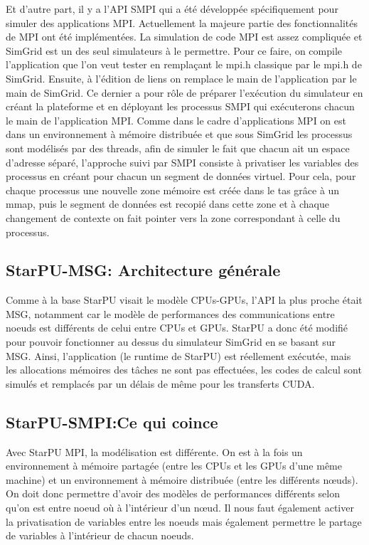 \documentclass[smallextended]{svjour3}
\begin{document}
Et d'autre part, il y a l'API SMPI qui a été développée
spécifiquement pour simuler des applications MPI. Actuellement la
majeure partie des fonctionnalités de MPI ont été implémentées. La
simulation de code MPI est assez compliquée et SimGrid est un des
seul simulateurs à le permettre. Pour ce faire, on compile
l'application que l'on veut tester en remplaçant le mpi.h classique
par le mpi.h de SimGrid. Ensuite, à l'édition de liens on remplace
le main de l'application par le main de SimGrid. Ce dernier a pour
rôle de préparer l'exécution du simulateur en créant la plateforme
et en déployant les processus SMPI qui exécuterons chacun le main
de l'application MPI. Comme dans le cadre d'applications MPI on est
dans un environnement à mémoire distribuée et que sous SimGrid les
processus sont modélisés par des threads, afin de simuler le fait
que chacun ait un espace d'adresse séparé, l'approche suivi par SMPI
consiste à privatiser les variables des processus en créant pour
chacun un segment de données virtuel. Pour cela, pour chaque processus
une nouvelle zone mémoire est créée dans le tas grâce à un mmap, puis le
segment de données est recopié dans cette zone et à chaque
changement de contexte on fait pointer vers la zone correspondant à
celle du processus. 

\subsection{StarPU-MSG: Architecture générale}
\label{sec-3-2}
Comme à la base StarPU visait le modèle CPUs-GPUs, l'API la plus
proche était MSG, notamment car le modèle de performances des
communications entre noeuds est différents de celui entre CPUs et
GPUs. StarPU a donc été modifié pour pouvoir fonctionner au dessus
du simulateur SimGrid en se basant sur MSG. Ainsi, l'application
(le runtime de StarPU) est réellement exécutée, mais les
allocations mémoires des tâches ne sont pas effectuées, les codes
de calcul sont simulés et remplacés par un délais de même pour les
transferts CUDA.  

\subsection{StarPU-SMPI:Ce qui coince}
\label{sec-3-3}

Avec StarPU MPI, la modélisation est différente. On est à la fois
un environnement à mémoire partagée (entre les CPUs et les GPUs
d'une même machine) et un environnement à mémoire distribuée
(entre les différents nœuds). On doit donc permettre d'avoir des
modèles de performances différents selon qu'on est entre noeud où à
l'intérieur d'un nœud. Il nous faut également activer la
privatisation de variables entre les noeuds mais également
permettre le partage de variables à l'intérieur de chacun noeuds. 
\end{document}
